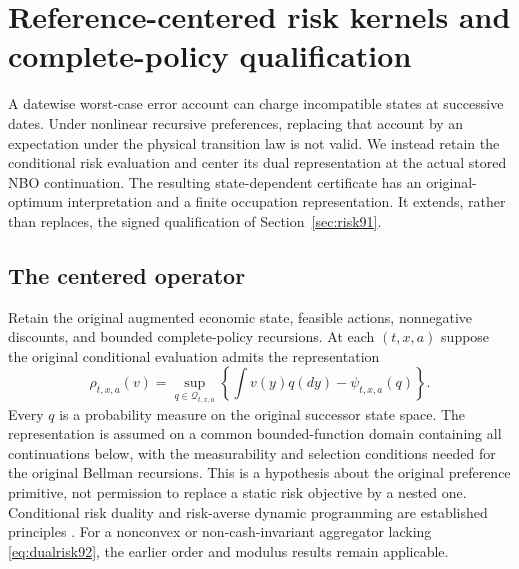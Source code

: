 \section{Reference-centered risk kernels and complete-policy qualification}\label{sec:centeredrisk92}
A datewise worst-case error account can charge incompatible states at successive dates. Under nonlinear recursive preferences, replacing that account by an expectation under the physical transition law is not valid. We instead retain the conditional risk evaluation and center its dual representation at the actual stored NBO continuation. The resulting state-dependent certificate has an original-optimum interpretation and a finite occupation representation. It extends, rather than replaces, the signed qualification of Section~\ref{sec:risk91}.

\subsection{The centered operator}
Retain the original augmented economic state, feasible actions, nonnegative discounts, and bounded complete-policy recursions. At each $(t,x,a)$ suppose the original conditional evaluation admits the representation
\begin{equation}\label{eq:dualrisk92}
 \rho_{t,x,a}(v)=\sup_{q\in\mathcal Q_{t,x,a}}
 \left\{\int v(y)q(dy)-\psi_{t,x,a}(q)\right\}.
\end{equation}
Every $q$ is a probability measure on the original successor state space. The representation is assumed on a common bounded-function domain containing all continuations below, with the measurability and selection conditions needed for the original Bellman recursions. This is a hypothesis about the original preference primitive, not permission to replace a static risk objective by a nested one. Conditional risk duality and risk-averse dynamic programming are established principles \citep{ruszczynski2010risk,ruszczynski2014erratum}. For a nonconvex or non-cash-invariant aggregator lacking \eqref{eq:dualrisk92}, the earlier order and modulus results remain applicable.

